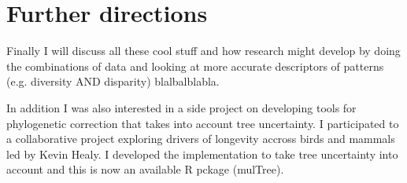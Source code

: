 \section{Further directions} %

Finally I will discuss all these cool stuff and how research might develop by doing the combinations of data and looking at more accurate descriptors of patterns (e.g. diversity AND disparity) blalbalblabla.

In addition I was also interested in a side project on developing tools for phylogenetic correction that takes into account tree uncertainty.
I participated to a collaborative project exploring drivers of longevity accross birds and mammals led by Kevin Healy.
I developed the implementation to take tree uncertainty into account and this is now an available R pckage (mulTree).

%
